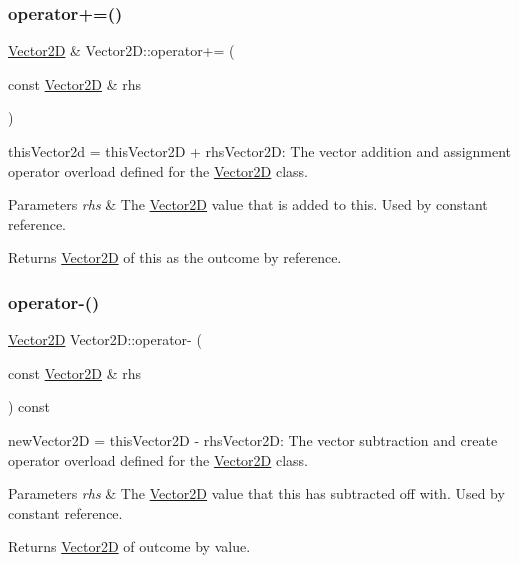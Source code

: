 \subsubsection{\texorpdfstring{operator+=()}{operator+=()}}
{\footnotesize\ttfamily \hyperlink{class_vector2_d}{Vector2D} \& Vector2\+D\+::operator+= (\begin{DoxyParamCaption}\item[{const \hyperlink{class_vector2_d}{Vector2D} \&}]{rhs }\end{DoxyParamCaption})}



this\+Vector2d = this\+Vector2D + rhs\+Vector2D\+: The vector addition and assignment operator overload defined for the \hyperlink{class_vector2_d}{Vector2D} class. 


\begin{DoxyParams}{Parameters}
{\em rhs} & The \hyperlink{class_vector2_d}{Vector2D} value that is added to this. Used by constant reference. \\
\hline
\end{DoxyParams}
\begin{DoxyReturn}{Returns}
\hyperlink{class_vector2_d}{Vector2D} of this as the outcome by reference. 
\end{DoxyReturn}
\mbox{\label{class_vector2_d_a803ee7e8cc2bfac23eb9e3aeebd5be3f}} 
\subsubsection{\texorpdfstring{operator-\/()}{operator-()}}
{\footnotesize\ttfamily \hyperlink{class_vector2_d}{Vector2D} Vector2\+D\+::operator-\/ (\begin{DoxyParamCaption}\item[{const \hyperlink{class_vector2_d}{Vector2D} \&}]{rhs }\end{DoxyParamCaption}) const}



new\+Vector2D = this\+Vector2D -\/ rhs\+Vector2D\+: The vector subtraction and create operator overload defined for the \hyperlink{class_vector2_d}{Vector2D} class. 


\begin{DoxyParams}{Parameters}
{\em rhs} & The \hyperlink{class_vector2_d}{Vector2D} value that this has subtracted off with. Used by constant reference. \\
\hline
\end{DoxyParams}
\begin{DoxyReturn}{Returns}
\hyperlink{class_vector2_d}{Vector2D} of outcome by value. 
\end{DoxyReturn}
\mbox{\label{class_vector2_d_a16532303ee3e0a340f0515c1f0675fbd}} 
